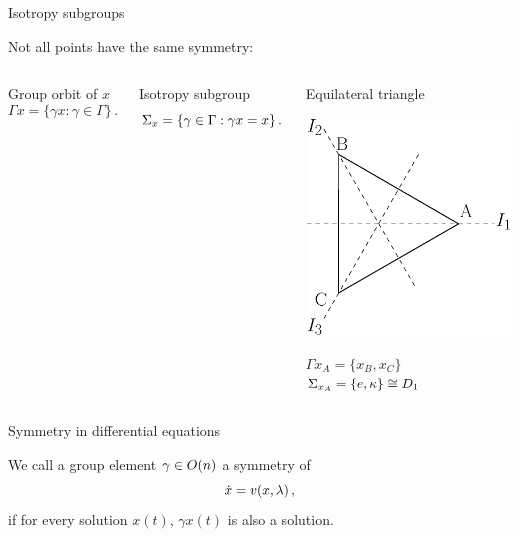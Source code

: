 \documentclass{beamer}
\begin{document}
\begin{frame}{Isotropy subgroups}

Not all points have the same symmetry:
\begin{columns}
	\begin{block}{Group orbit of $x$}
	\[
	\Gamma x = \{\gamma x: \gamma\in\Gamma\}\,.
	\]
	\end{block}
 	\begin{block}{Isotropy subgroup}
 	\[
 	\Sigma_{x}=\{\gamma\in\Gamma:\gamma x=x\}\,.
 	\]
 	\end{block}
 	\begin{exampleblock}{Equilateral triangle}
 	 	\begin{center}
 			\includegraphics[width=.7\textwidth]{../../figs/D3triangle}
 		\end{center}
	$\Gamma x_A=\{x_B,x_C\}$
 	$\Sigma_{x_A}=\{e,\kappa\}\cong D_{1}$
 	\end{exampleblock}
\end{columns}

\end{frame}



\begin{frame}{Symmetry in differential equations}

\begin{block}{}
 We call a group element $\gamma\in O(n)$ a symmetry of
\[
	\dot{x} = v(x,\lambda)\,,
	\label{eq:difeq} 
\]  
if for every solution $x(t)$, $\gamma x(t)$ is also a solution.
\end{block}

\end{frame}
\end{document}
